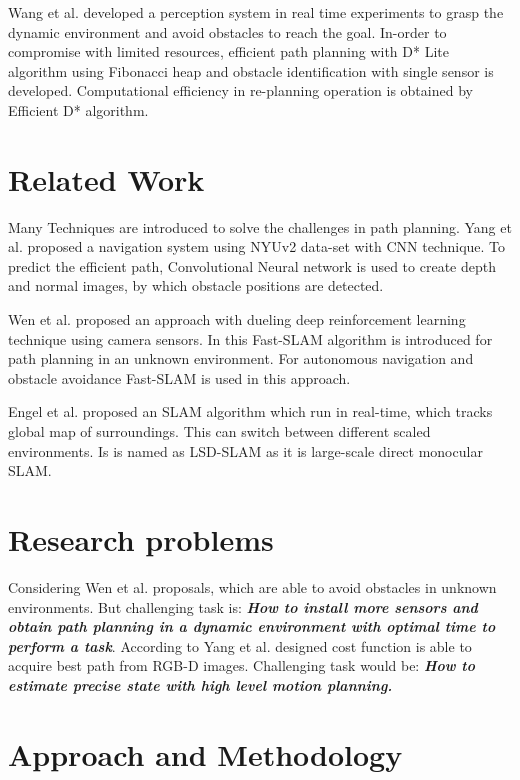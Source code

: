 \documentclass[a4paper]{article}
\begin{document}
Wang et al. developed a perception system in real time experiments to grasp the dynamic environment and avoid obstacles to reach the goal. In-order to compromise with limited resources, efficient path planning with D* Lite algorithm using Fibonacci heap and obstacle identification with single sensor is developed. Computational efficiency in re-planning operation is obtained by Efficient D* algorithm.  \cite{Wang2017Real-timeEnvironments}

\section{Related Work}

Many Techniques are introduced to solve the challenges in path planning. Yang et al. proposed a navigation system using NYUv2 data-set with CNN technique. To predict the efficient path, Convolutional Neural network is used to create depth and normal images, by which obstacle positions are detected.   \cite{Yang2017ObstaclePerception}

Wen et al. proposed an approach with dueling deep reinforcement learning technique using camera sensors. In this Fast-SLAM algorithm is introduced for path planning in an unknown environment. For autonomous navigation and obstacle avoidance Fast-SLAM is used in this approach. \cite{Wen2020PathEnvironments}

Engel et al. proposed an SLAM algorithm which run in real-time, which tracks global map of surroundings. This can switch between different scaled environments. Is is named as LSD-SLAM as it is large-scale direct monocular SLAM.  \cite{EngelLSD-SLAM:SLAM}




\section{Research problems}

Considering Wen et al.  proposals, which are able to avoid obstacles in unknown environments. But challenging task is: \textit{\textbf{How to install more sensors and obtain path planning in a dynamic environment with optimal time to perform a task}}.\cite{Wen2020PathEnvironments} According to Yang et al. designed cost function is able to acquire best path from RGB-D images. Challenging task would be: \textit{\textbf {How to estimate precise state with high level motion planning.}}\cite{Yang2017ObstaclePerception}

\section{Approach and Methodology}
\end{document}
